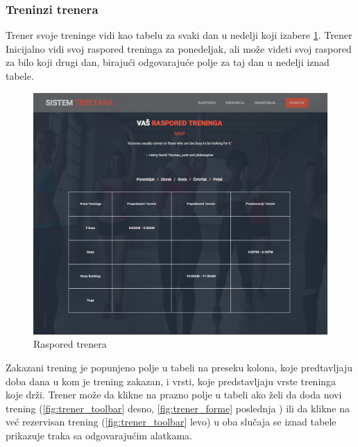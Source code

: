 \documentclass[../main.tex]{subfiles}
\begin{document}
\subsubsection{Treninzi trenera}
Trener svoje treninge vidi kao tabelu za svaki dan u nedelji koji izabere \ref{fig:trener_raspored}. Trener Inicijalno vidi svoj raspored treninga za ponedeljak, ali može videti svoj raspored za bilo koji drugi dan, birajući odgovarajuće polje za taj dan u nedelji iznad tabele.

\begin{figure}[!ht]
\begin{center}
\includegraphics[scale=0.35]{sections/korisnicki_interfejs/screenshots/trener_raspored_init.PNG}
\end{center}
\caption{Raspored trenera}
\label{fig:trener_raspored}
\end{figure}


Zakazani trening je popunjeno polje u tabeli na preseku kolona, koje predtavljaju doba dana u kom je trening zakazan, i vrsti, koje predstavljaju vrste treninga koje drži. Trener može da klikne na prazno polje u tabeli ako želi da doda novi trening (\ref{fig:trener_toolbar} desno, \ref{fig:trener_forme} poslednja ) ili da klikne na već rezervisan trening (\ref{fig:trener_toolbar} levo) u oba slučaja se iznad tabele prikazuje traka sa odgovarajućim alatkama. 
\end{document}
